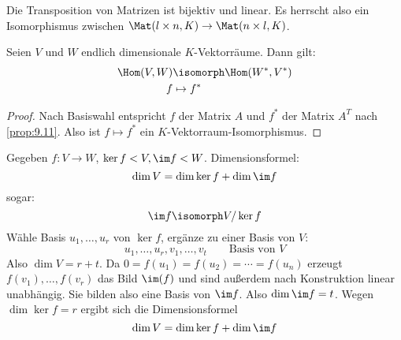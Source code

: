 \documentclass{mycourse}
\begin{document}
\begin{note}
Die Transposition von Matrizen ist bijektiv und linear.
Es herrscht also ein Isomorphismus zwischen $\Mat(l\times n,K)\to \Mat(n\times l,K)$.
\end{note}

\begin{kor}
\label{kor:9.12}
Seien $V$ und $W$ endlich dimensionale $K$-Vektorräume.
Dann gilt:
\begin{align*}
\Hom(V,W)&\isomorph \Hom(W^*,V^*)\\
\qquad\qquad f&\mapsto f^*
\end{align*}
\begin{proof}
Nach Basiswahl entspricht $f$ der Matrix $A$ und $f^*$ der Matrix $A^T$ nach \ref{prop:9.11}.
Also ist $f\mapsto f^*$ ein $K$-Vektorraum-Isomorphismus.
\end{proof}

\begin{note}
Gegeben $f:V\to W$, $\ker f <V, \im f <W$.
Dimensionsformel:
\[
	\dim V = \dim \ker f + \dim \im f
\]
sogar:
\[
\im f \isomorph V/\ker f
\]
Wähle Basis $u_1,\dotsc,u_r$ von $\ker f$, ergänze zu einer Basis von $V$:
\[
u_1,\dotsc,u_r,v_1,\dotsc,v_t \qquad \text{Basis von $V$}
\]
Also $\dim V=r+t$.
Da $0=f(u_1)=f(u_2)=\dotsb=f(u_n)$ erzeugt $f(v_1),\dotsc,f(v_r)$ das Bild $\im(f)$ und sind außerdem nach Konstruktion linear unabhängig.
Sie bilden also eine Basis von $\im f$.
Also $\dim \im f = t$.
Wegen $\dim \ker f = r$ ergibt sich die Dimensionsformel
\[
	\dim V = \dim \ker f + \dim \im f
\]
\end{note}
\end{kor}
\end{document}
